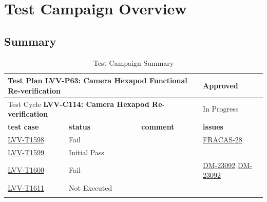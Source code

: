 \documentclass[SE,lsstdraft,STR,toc]{lsstdoc}
\begin{document}
\newpage

\section{Test Campaign Overview}
\label{sect:overview}

\subsection{Summary}
\label{sect:summarytable}

\begin{longtable}{p{2cm}p{2.5cm}p{9cm}p{2.5cm}}
\toprule
\multicolumn{3}{p{13.5cm}}{ Test Plan {\bf LVV-P63: Camera Hexapod Functional Re-verification }} & Approved \\\hline

  \multicolumn{3}{p{13.5cm}}{ Test Cycle {\bf LVV-C114: Camera Hexapod Re-verification }} & In Progress \\\hline

  {\bf \footnotesize test case} & {\bf \footnotesize status} & {\bf \footnotesize comment} & {\bf \footnotesize issues} \\\toprule

    \href{https://jira.lsstcorp.org/secure/Tests.jspa#/testCase/LVV-T1598}{LVV-T1598}
    & Fail &
    \begin{minipage}[]{9cm}
    \smallskip
    
    \medskip
    \end{minipage}
    &
          \href{https://jira.lsstcorp.org/browse/FRACAS-28}{FRACAS-28}
    \\\hline
    \href{https://jira.lsstcorp.org/secure/Tests.jspa#/testCase/LVV-T1599}{LVV-T1599}
    & Initial Pass &
    \begin{minipage}[]{9cm}
    \smallskip
    
    \medskip
    \end{minipage}
    &
    \\\hline
    \href{https://jira.lsstcorp.org/secure/Tests.jspa#/testCase/LVV-T1600}{LVV-T1600}
    & Fail &
    \begin{minipage}[]{9cm}
    \smallskip
    
    \medskip
    \end{minipage}
    &
          \href{https://jira.lsstcorp.org/browse/DM-23092}{DM-23092}
          \href{https://jira.lsstcorp.org/browse/DM-23092}{DM-23092}
    \\\hline
    \href{https://jira.lsstcorp.org/secure/Tests.jspa#/testCase/LVV-T1611}{LVV-T1611}
    & Not Executed &
    \begin{minipage}[]{9cm}
    \smallskip
    
    \medskip
    \end{minipage}
    &
    \\\hline
\caption{Test Campaign Summary}
\label{table:summary}
\end{longtable}
\end{document}
